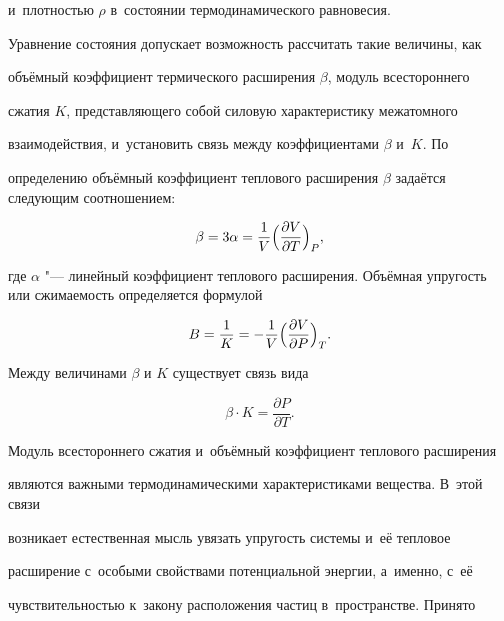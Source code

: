 и~плотностью $\rho $ в~состоянии термодинамического равновесия.



Уравнение состояния допускает возможность рассчитать такие величины, как 

объёмный коэффициент термического расширения $\beta$, модуль всестороннего 

сжатия $K$, представляющего собой силовую характеристику межатомного 

взаимодействия, и~установить связь между коэффициентами $\beta$ и~$K$. По 

определению объёмный коэффициент теплового расширения $\beta$ задаётся следующим соотношением:

\begin{equation}

\label{eq1}

\beta =3\alpha =\frac1V\Bigl( \frac{\partial V}{\partial T}\Bigr)_P ,

\end{equation}

где $\alpha $ "--- линейный коэффициент теплового расширения. Объёмная  упругость или сжимаемость определяется формулой

\begin{equation}

\label{eq2}

B=\frac 1K=-\frac1V\Bigl( \frac{\partial V}{\partial P}\Bigr)_T .

\end{equation}



Между величинами $\beta $ и $K$ существует связь вида

\begin{equation}

\label{eq3}

\beta \cdot K=\frac{\partial P}{\partial T}.

\end{equation}



Модуль всестороннего сжатия и~объёмный коэффициент теплового расширения 

являются важными термодинамическими характеристиками вещества. В~этой связи 

возникает естественная мысль увязать упругость системы и~её тепловое 

расширение с~особыми свойствами потенциальной энергии, а~именно, с~её 

чувствительностью к~закону расположения частиц в~пространстве. Принято 

